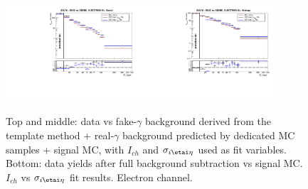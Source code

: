 \begin{figure}[htb]
\begin{center}
\includegraphics[width=0.45\textwidth]{../figs/figs_v11/ELECTRON_WGamma/PrepareYields/c_BkgSubtrDATAvsSIGMC_c_ELECTRON_WGamma__UNblind__Barrel__phoEt.pdf}\includegraphics[width=0.45\textwidth]{../figs/figs_v11/ELECTRON_WGamma/PrepareYields/c_BkgSubtrDATAvsSIGMC_c_ELECTRON_WGamma__UNblind__Endcap__phoEt.pdf}\\
  \caption{Top and middle: data vs fake-$\gamma$ background derived from the template method + real-$\gamma$ background predicted by dedicated MC samples + signal MC, with $I_{ch}$ and $\sigma_{i\etai\eta}$ used as fit variables. Bottom: data yields after full background subtraction vs signal MC. $I_{ch}$ vs $\sigma_{i\etai\eta}$ fit results. Electron channel.}
  \label{fig:DDvsMC_Wg_Data_ELECTRON}
  \end{center}
\end{figure}

